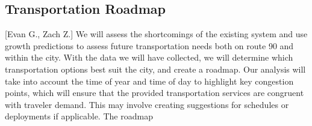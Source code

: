 \documentclass[12pt]{article}                         %
\begin{document}
\subsection{Transportation Roadmap}[Evan G., Zach Z.]
We will assess the shortcomings of the existing system and use growth predictions to assess future transportation needs both on route 90 and within the city. With the data we will have collected, we will determine which transportation options best suit the city, and create a roadmap. Our analysis will take into account the time of year and time of day to highlight key congestion points, which will ensure that the provided transportation services are congruent with traveler demand. This may involve creating suggestions for schedules or deployments if applicable. The roadmap 


\newpage


\end{document}
